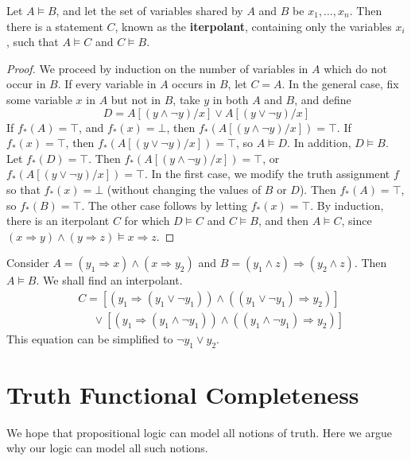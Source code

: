 \begin{theorem}
    Let $A \vDash B$, and let the set of variables shared by $A$ and $B$ be $x_1, \dots, x_n$. Then there is a statement $C$, known as the {\bf iterpolant}, containing only the variables $x_i$, such that $A \vDash C$ and $C \vDash B$.
\end{theorem}
\begin{proof}
    We proceed by induction on the number of variables in $A$ which do not occur in $B$. If every variable in $A$ occurs in $B$, let $C = A$. In the general case, fix some variable $x$ in $A$ but not in $B$, take $y$ in both $A$ and $B$, and define
    \[ D = A[(y \wedge \neg y)/x] \vee A[(y \vee \neg y)/x] \]
    If $f_*(A) = \top$, and $f_*(x) = \bot$, then $f_*(A[(y \wedge \neg y)/x]) = \top$. If $f_*(x) = \top$, then $f_*(A[(y \vee \neg y)/x]) = \top$, so $A \vDash D$. In addition, $D \vDash B$. Let $f_*(D) = \top$. Then $f_*(A[(y \wedge \neg y)/x]) = \top$, or $f_*(A[(y \vee \neg y)/x]) = \top$. In the first case, we modify the truth assignment $f$ so that $f_*(x) = \bot$ (without changing the values of $B$ or $D$). Then $f_*(A) = \top$, so $f_*(B) = \top$. The other case follows by letting $f_*(x) = \top$. By induction, there is an iterpolant $C$ for which $D \vDash C$ and $C \vDash B$, and then $A \vDash C$, since $(x \Rightarrow y) \wedge (y \Rightarrow z) \vDash x \Rightarrow z$.
\end{proof}

\begin{example}
    Consider $A = (y_1 \Rightarrow x) \wedge (x \Rightarrow y_2)$ and $B = (y_1 \wedge z) \Rightarrow (y_2 \wedge z)$. Then $A \vDash B$. We shall find an interpolant.
    \begin{align*}
        &C = [(y_1 \Rightarrow (y_1 \vee \neg y_1)) \wedge ((y_1 \vee \neg y_1) \Rightarrow y_2)]\\
        &\ \ \ \ \ \ \vee [(y_1 \Rightarrow (y_1 \wedge \neg y_1)) \wedge ((y_1 \wedge \neg y_1) \Rightarrow y_2)]
    \end{align*}
    This equation can be simplified to $\neg y_1 \vee y_2$.
\end{example}

\section{Truth Functional Completeness}

We hope that propositional logic can model all notions of truth. Here we argue why our logic can model all such notions.

